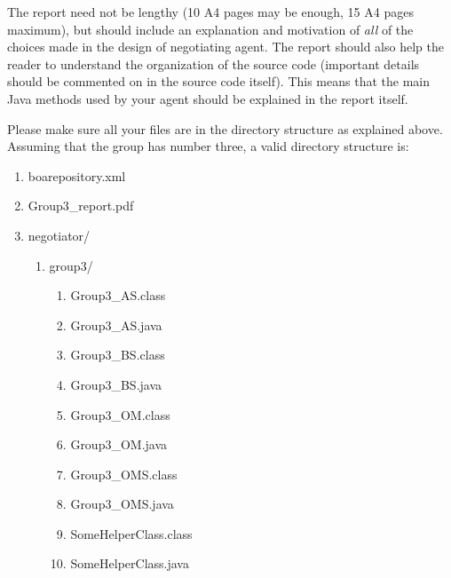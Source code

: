 \documentclass[a4paper]{article}
\begin{document}
The report need not be lengthy (10 A4 pages may be enough, 15 A4 pages maximum), but should include an explanation and motivation of {\em all} of the choices made in the design of negotiating agent. The report should also help the reader to understand the organization of the source code (important details should be commented on in the source code itself). This means that the main Java methods used by your agent should be explained in the report itself.

     Please make sure all your files are in the directory structure as explained above. Assuming that the group has number three, a valid directory structure is:

\begin{enumerate}
	\item[] boarepository.xml\vspace{-0.3cm}
	\item[] Group3\_report.pdf\vspace{-0.3cm}
	\item[] negotiator/\vspace{-0.3cm}
	\begin{enumerate}
		\item[] group3/\vspace{-0.1cm}
		\begin{enumerate}
			\item[] Group3\_AS.class\vspace{-0.1cm}
			\item[] Group3\_AS.java\vspace{-0.1cm}
			\item[] Group3\_BS.class\vspace{-0.1cm}
			\item[] Group3\_BS.java\vspace{-0.1cm}
			\item[] Group3\_OM.class\vspace{-0.1cm}
			\item[] Group3\_OM.java\vspace{-0.1cm}
			\item[] Group3\_OMS.class\vspace{-0.1cm}
			\item[] Group3\_OMS.java\vspace{-0.1cm}
			\item[] SomeHelperClass.class\vspace{-0.1cm}
			\item[] SomeHelperClass.java\vspace{-0.1cm}

		\end{enumerate}
	\end{enumerate}
\end{enumerate}
\end{document}
